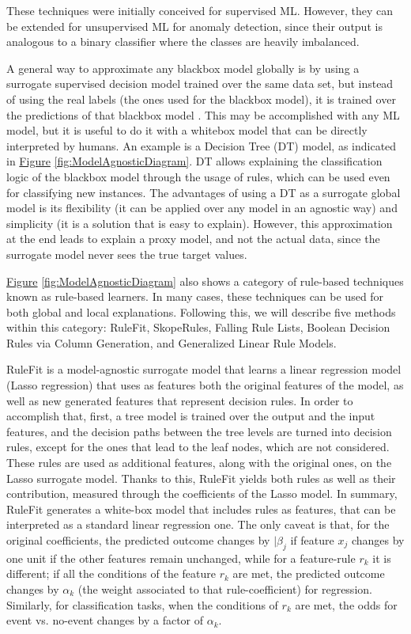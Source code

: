 These techniques were initially conceived for supervised ML. However, they can be extended for unsupervised ML for anomaly detection, since their output is analogous to a binary classifier where the classes are heavily imbalanced.

A general way to approximate any blackbox model globally is by using a surrogate supervised decision model trained over the same data set, but instead of using the real labels (the ones used for the blackbox model), it is trained over the predictions of that blackbox model \parencite{molnar2019interpretable}. This may be accomplished with any ML model, but it is useful to do it with a whitebox model that can be directly interpreted by humans. An example is a Decision Tree (DT) model, as indicated in \hyperref[fig:ModelAgnosticDiagram]{Figure} \ref{fig:ModelAgnosticDiagram}. DT allows explaining the classification logic of the blackbox model through the usage of rules, which can be used even for classifying new instances. The advantages of using a DT as a surrogate global model is its flexibility (it can be applied over any model in an agnostic way) and simplicity (it is a solution that is easy to explain). However, this approximation at the end leads to explain a proxy model, and not the actual data, since the surrogate model never sees the true target values.

\hyperref[fig:ModelAgnosticDiagram]{Figure} \ref{fig:ModelAgnosticDiagram} also shows a category of rule-based techniques known as rule-based learners. In many cases, these techniques can be used for both global and local explanations. Following this, we will describe five methods within this category: RuleFit, SkopeRules, Falling Rule Lists, Boolean Decision Rules via Column Generation, and Generalized Linear Rule Models.

RuleFit \parencite{friedman2008predictive} is a model-agnostic surrogate model that learns a linear regression model (Lasso regression) that uses as features both the original features of the model, as well as new generated features that represent decision rules. In order to accomplish that, first, a tree model is trained over the output and the input features, and the decision paths between the tree levels are turned into decision rules, except for the ones that lead to the leaf nodes, which are not considered. These rules are used as additional features, along with the original ones, on the Lasso surrogate model. Thanks to this, RuleFit yields both rules as well as their contribution, measured through the coefficients of the Lasso model. In summary, RuleFit generates a white-box model that includes rules as features, that can be interpreted as a standard linear regression one. The only caveat is that, for the original coefficients, the predicted outcome changes by $|\beta_j$ if feature $x_j$ changes by one unit if the other features remain unchanged, while for a feature-rule $r_k$ it is different; if all the conditions of the feature $r_k$ are met, the predicted outcome changes by $\alpha_k$ (the weight associated to that rule-coefficient) for regression. Similarly, for classification tasks, when the conditions of $r_k$ are met, the odds for event vs. no-event changes by a factor of $\alpha_k$.

